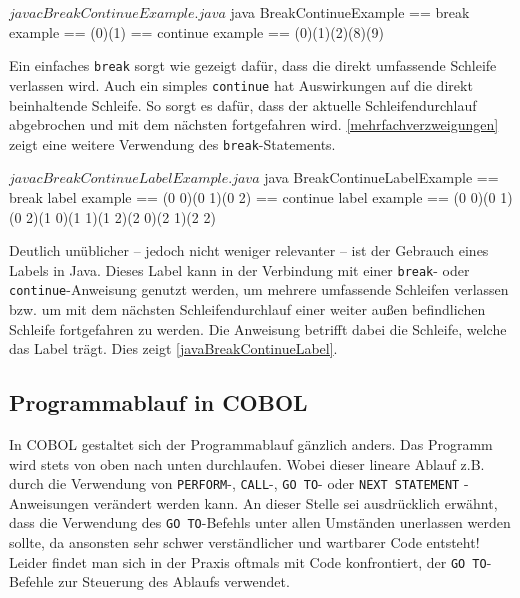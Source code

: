\sepCodeAndOutputCheck
\begin{shellwindow}
$ javac BreakContinueExample.java 
$ java BreakContinueExample
== break example == 
(0)(1)
== continue example == 
(0)(1)(2)(8)(9)
\end{shellwindow}

Ein einfaches \texttt{break} sorgt wie gezeigt dafür, dass die direkt umfassende Schleife verlassen wird. Auch ein simples \texttt{continue} hat Auswirkungen auf die direkt beinhaltende Schleife. So sorgt es dafür, dass der aktuelle Schleifendurchlauf abgebrochen und mit dem nächsten fortgefahren wird. \autoref{mehrfachverzweigungen} zeigt eine weitere Verwendung des \texttt{break}-Statements.\\

\sepCodeAndOutputCheck
\begin{shellwindow}
$ javac BreakContinueLabelExample.java 
$ java BreakContinueLabelExample
== break label example == 
(0 0)(0 1)(0 2)
== continue label example == 
(0 0)(0 1)(0 2)(1 0)(1 1)(1 2)(2 0)(2 1)(2 2)
\end{shellwindow}

Deutlich unüblicher -- jedoch nicht weniger relevanter -- ist der Gebrauch eines Labels in Java. Dieses Label kann in der Verbindung mit einer \texttt{break}- oder \texttt{continue}-Anweisung genutzt werden, um mehrere umfassende Schleifen verlassen bzw. um mit dem nächsten Schleifendurchlauf einer weiter außen befindlichen Schleife fortgefahren zu werden. Die Anweisung betrifft dabei die Schleife, welche das Label trägt. Dies zeigt \autoref{javaBreakContinueLabel}.\\

\subsection*{Programmablauf in COBOL}

In COBOL gestaltet sich der Programmablauf gänzlich anders. Das Programm wird stets von oben nach unten durchlaufen. Wobei dieser lineare Ablauf z.B. durch die Verwendung von \texttt{PERFORM}-, \texttt{CALL}-, \texttt{GO TO}- oder \texttt{NEXT STATEMENT} -Anweisungen verändert werden kann. An dieser Stelle sei ausdrücklich erwähnt, dass die Verwendung des \texttt{GO TO}-Befehls unter allen Umständen unerlassen werden sollte, da ansonsten sehr schwer verständlicher und wartbarer Code entsteht! Leider findet man sich in der Praxis oftmals mit Code konfrontiert, der \texttt{GO TO}-Befehle zur Steuerung des Ablaufs verwendet.\\

